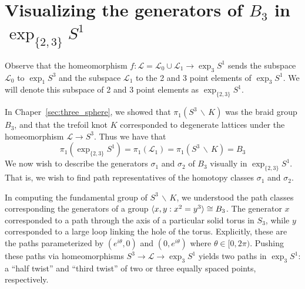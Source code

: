 \documentclass[12pt,twoside]{reedthesis}
\theoremstyle{definition}
\newcommand{\LS}{\mathcal{L}}
\newcommand{\exptwothree}{\exp_{\{2,3\}}}
\newcommand{\wo}{\, \backslash \,}
\DeclarePairedDelimiter\ang{\langle}{\rangle}
\begin{document}
\section{Visualizing the generators of $B_3$ in $\exptwothree S^1$}

Observe that the homeomorphism $f : \LS = \LS_0 \cup \LS_1 \to \exp_3 S^1$ sends the subspace $\LS_0 $ to $\exp_1 S^3$ and the subspace $\LS_1$ to the 2 and 3 point elements of $\exp_3 S^1$.
We will denote this subspace of 2 and 3 point elements as $\exptwothree S^1$.

In Chaper~\ref{sec:three_sphere}, we showed that $\pi_1(S^3 \wo K)$ was the braid group $B_3$, and that the trefoil knot $K$ corresponded to degenerate lattices under the homeomorphism $\LS \to S^3$.
Thus we have that
\begin{equation*}
  \pi_1(\exptwothree S^1) = \pi_1(\LS_1) = \pi_1(S^3 \wo K) = B_3
\end{equation*}
We now wish to describe the generators $\sigma_1$ and $\sigma_2$ of $B_3$ visually in $\exptwothree S^1$.
That is, we wish to find path representatives of the homotopy classes $\sigma_1$ and $\sigma_2$.

In computing the fundamental group of $S^3 \wo K$, we understood the path classes corresponding the generators of a group $\ang{x, y : x^2 = y^3} \cong B_3$.
The generator $x$ corresponded to a path through the axis of a particular solid torus in $S_3$, while $y$ corresponded to a large loop linking the hole of the torus.
Explicitly, these are the paths parameterized by $(e^{i \theta}, 0)$ and $(0, e^{i \theta})$ where $\theta \in [0, 2 \pi)$.
Pushing these paths via homeomorphisms $S^3 \to \LS \to \exp_3 S^1$ yields two paths in $\exp_3 S^1$: a ``half twist'' and ``third twist'' of two or three equally spaced points, respectively.
\end{document}

